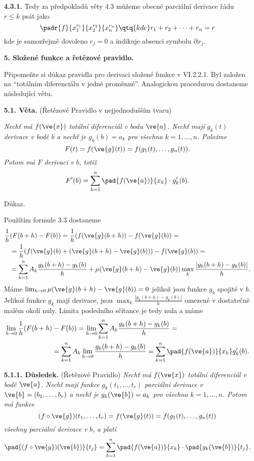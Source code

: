 \documentclass[12pt]{article}
\begin{document}
{{\bf 4.3.1.} Tedy za předpokladů věty 4.3 můžeme obecné parciální derivace
řádu $r\leq k$ psát jako
$$
\padr{f}{x_1^{r_1}}{x_2^{r_2}}{x_n^{r_n}}\qtq{kde} r_1+r_2+\cdots+r_n=r
$$
kde je samozřejmě dovoleno $r_j=0$ a indikuje absenci symbolu $\partial x_j$.



\vskip10mm
 
  
 {\large\bf 5. Složené funkce a řetězové pravidlo.}
 
 \bigskip
 
Připomeňte si důkaz pravidla pro derivaci složené funkce v VI.2.2.1.
Byl založen na ``totálním diferenciálu v jedné proměnné''. Analogickou procedurou dostaneme následující větu.

\medskip


{\bf 5.1. Věta.} (Řetězové Pravidlo v nejjednodušším tvaru) {\em Nechť má $f(\ve{x})$ totální diferenciál v bodu $\ve{a}$. 
Nechť mají $g_k(t)$ derivace v bodě $b$ 
a nechť je $g_k(b)=a_k$ pro všechna $k=1,\dots,n$. Položme
$$
F(t)=f(\ve{g}(t))=f(g_1(t),\dots,g_n(t)).
$$
Potom má $F$ derivaci v  $b$, totiž
$$
F'(b)=\sum_{k=1}^n\pad{f(\ve{a})}{x_k}\cdot g'_k(b).
$$

Důkaz.} Použítím formule  3.3 
dostaneme
$$ \begin{aligned}
\frac1h&(F(b+h)-F(b))=\frac1h(f(\ve{g}(b+h))-f(\ve{g}(b))=\\
&=\frac1h(f(\ve{g}(b)+(\ve{g}(b+h)-\ve{g}(b)))-f(\ve{g}(b))=\\
&=\sum_{k=1}^nA_k\frac{g_k(b+h)-g_k(b)}{h}+ \mu(\ve{g}(b+h)-\ve{g}(b))\max_k\frac{|g_k(b+h)-g_k(b)|}{h}.
\end{aligned}
$$
Máme $\lim_{h\to 0}\mu(\ve{g}(b+h)-\ve{g}(b))=0$ jelikož jsou funkce $g_k$ spojité v $b$. Jelikož funkce $g_k$ mají derivace, jsou
$\max_k\frac{|g_k(b+h)-g_k(b)|}{h}$  omezené v dostatečně malém okolí nuly. Limita posledního sčítance je tedy nula a máme
$$
\begin{aligned}
\lim_{h\to 0}\frac1h(F(b+h)&-F(b))
=\lim_{h\to 0}\sum_{k=1}^nA_k\frac{g_k(b+h)-g_k(b)}{h}=\\
&=\sum_{k=1}^nA_k\lim_{h\to 0}\frac{g_k(b+h)-g_k(b)}{h}=\sum_{k=1}^n \pad{f(\ve{a})}{x_k}g'_k(b).
\end{aligned}
$$
\sq

\bigskip

{\bf 5.1.1. Důsledek.} (Řetězové Pravidlo)  {\em Nechť má $f(\ve{x})$ totální diferenciál v bodě $\ve{a}$. 
Nechť mají funkce $g_k(t_1,\dots,t_r)$ parciální derivace 
v $\ve{b}=(b_1,\dots,b_r)$ a nechť je $g_k(\ve{b})=a_k$ pro všechna $k=1,\dots,n$. Potom má funkce
$$
(f\circ \ve{g})(t_1,\dots,t_r)=f(\ve{g}(t))=f(g_1(t),\dots,g_n(t))
$$
všechny parciální derivace v $b$, a platí
$$
\pad{(f\circ\ve{g})(\ve{b})}{t_j}=\sum_{k=1}^n\pad{f(\ve{a})}{x_k}\cdot \pad{g_k(\ve{b})}{t_j}.
$$
}

}
\end{document}
